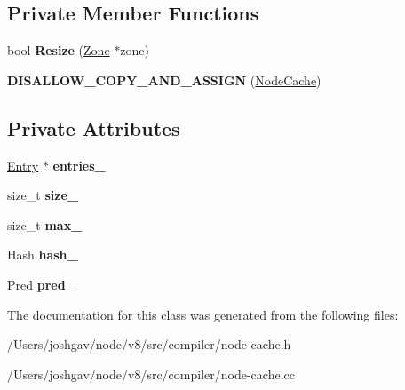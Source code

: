 \subsection*{Private Member Functions}
\begin{DoxyCompactItemize}
\item 
bool {\bfseries Resize} (\hyperlink{classv8_1_1internal_1_1_zone}{Zone} $\ast$zone)\hypertarget{classv8_1_1internal_1_1compiler_1_1_node_cache_af6f3f885cee698eb905d23db7364a826}{}\label{classv8_1_1internal_1_1compiler_1_1_node_cache_af6f3f885cee698eb905d23db7364a826}

\item 
{\bfseries D\+I\+S\+A\+L\+L\+O\+W\+\_\+\+C\+O\+P\+Y\+\_\+\+A\+N\+D\+\_\+\+A\+S\+S\+I\+GN} (\hyperlink{classv8_1_1internal_1_1compiler_1_1_node_cache}{Node\+Cache})\hypertarget{classv8_1_1internal_1_1compiler_1_1_node_cache_a4e1ea47e4ce854b15d7eb2f29df019b9}{}\label{classv8_1_1internal_1_1compiler_1_1_node_cache_a4e1ea47e4ce854b15d7eb2f29df019b9}

\end{DoxyCompactItemize}
\subsection*{Private Attributes}
\begin{DoxyCompactItemize}
\item 
\hyperlink{structv8_1_1internal_1_1compiler_1_1_node_cache_1_1_entry}{Entry} $\ast$ {\bfseries entries\+\_\+}\hypertarget{classv8_1_1internal_1_1compiler_1_1_node_cache_aa0e3d4579baac38cb24c19a8068b2f42}{}\label{classv8_1_1internal_1_1compiler_1_1_node_cache_aa0e3d4579baac38cb24c19a8068b2f42}

\item 
size\+\_\+t {\bfseries size\+\_\+}\hypertarget{classv8_1_1internal_1_1compiler_1_1_node_cache_a9b21f1690806574d4441f620dc18021c}{}\label{classv8_1_1internal_1_1compiler_1_1_node_cache_a9b21f1690806574d4441f620dc18021c}

\item 
size\+\_\+t {\bfseries max\+\_\+}\hypertarget{classv8_1_1internal_1_1compiler_1_1_node_cache_a59de074e07e4c28ce2f71f23747fcd1f}{}\label{classv8_1_1internal_1_1compiler_1_1_node_cache_a59de074e07e4c28ce2f71f23747fcd1f}

\item 
Hash {\bfseries hash\+\_\+}\hypertarget{classv8_1_1internal_1_1compiler_1_1_node_cache_a1d2688c43ddc404743e6f0104ff44206}{}\label{classv8_1_1internal_1_1compiler_1_1_node_cache_a1d2688c43ddc404743e6f0104ff44206}

\item 
Pred {\bfseries pred\+\_\+}\hypertarget{classv8_1_1internal_1_1compiler_1_1_node_cache_a86b5d881b6b6e270fa8abe4a38070d8d}{}\label{classv8_1_1internal_1_1compiler_1_1_node_cache_a86b5d881b6b6e270fa8abe4a38070d8d}

\end{DoxyCompactItemize}


The documentation for this class was generated from the following files\+:\begin{DoxyCompactItemize}
\item 
/\+Users/joshgav/node/v8/src/compiler/node-\/cache.\+h\item 
/\+Users/joshgav/node/v8/src/compiler/node-\/cache.\+cc\end{DoxyCompactItemize}
